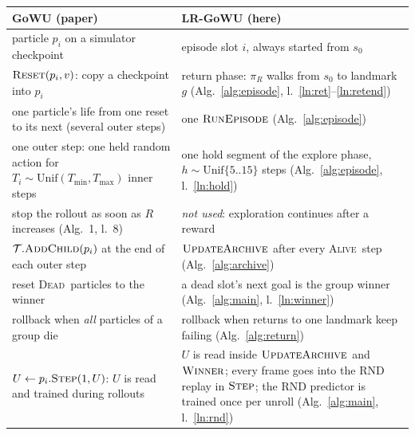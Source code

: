 \documentclass[10pt]{article}
\newcommand{\Unif}{\mathrm{Unif}}
\newcommand{\Dead}{\textsc{Dead}}
\newcommand{\Alive}{\textsc{Alive}}
\newcommand{\proc}[1]{\textsc{#1}}
\begin{document}
\begin{center}\small
\begin{tabularx}{\linewidth}{@{}>{\raggedright\arraybackslash}p{6.2cm}X@{}}\toprule
\textbf{GoWU (paper)} & \textbf{LR-GoWU (here)}\\\midrule
particle $p_i$ on a simulator checkpoint & episode slot $i$, always started from $s_0$\\\addlinespace[3pt]
$\proc{Reset}(p_i, v)$: copy a checkpoint into $p_i$ & return phase: $\pi_R$ walks from $s_0$ to landmark $g$ (Alg.~\ref{alg:episode}, l.~\ref{ln:ret}--\ref{ln:retend})\\\addlinespace[3pt]
one particle's life from one reset to its next (several outer steps) & one $\proc{RunEpisode}$ (Alg.~\ref{alg:episode})\\\addlinespace[3pt]
one outer step: one held random action for $T_i \sim \Unif(T_{\min}, T_{\max})$ inner steps & one hold segment of the explore phase, $h \sim \Unif\{5..15\}$ steps (Alg.~\ref{alg:episode}, l.~\ref{ln:hold})\\\addlinespace[3pt]
stop the rollout as soon as $R$ increases (Alg.~1, l.~8) & \emph{not used}: exploration continues after a reward\\\addlinespace[3pt]
$\mathcal{T}.\proc{AddChild}(p_i)$ at the end of each outer step & $\proc{UpdateArchive}$ after every \Alive\ step (Alg.~\ref{alg:archive})\\\addlinespace[3pt]
reset \Dead\ particles to the winner & a dead slot's next goal is the group winner (Alg.~\ref{alg:main}, l.~\ref{ln:winner})\\\addlinespace[3pt]
rollback when \emph{all} particles of a group die & rollback when returns to one landmark keep failing (Alg.~\ref{alg:return})\\\addlinespace[3pt]
$U \gets p_i.\proc{Step}(1, U)$: $U$ is read and trained during rollouts & $U$ is read inside $\proc{UpdateArchive}$ and $\proc{Winner}$; every frame goes into the RND replay in $\proc{Step}$; the RND predictor is trained once per unroll (Alg.~\ref{alg:main}, l.~\ref{ln:rnd})\\
\bottomrule\end{tabularx}
\end{center}

\clearpage
\end{document}
